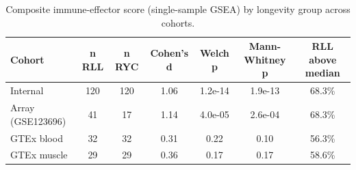 \documentclass[unnumsec,webpdf,contemporary,large]{oup-authoring-template}
\begin{document}
\begin{table}[htbp]
\caption{Composite immune-effector score (single-sample GSEA) by longevity group across cohorts.}
\label{tab:immaxis}
\begin{center}
\begin{tabular}{lcccccc}
\hline
Cohort & n RLL & n RYC & Cohen's d & Welch p & Mann-Whitney p & RLL above median \\
\hline
Internal & 120 & 120 & 1.06 & 1.2e-14 & 1.9e-13 & 68.3\% \\
Array (GSE123696) & 41 & 17 & 1.14 & 4.0e-05 & 2.6e-04 & 68.3\% \\
GTEx blood & 32 & 32 & 0.31 & 0.22 & 0.10 & 56.3\% \\
GTEx muscle & 29 & 29 & 0.36 & 0.17 & 0.17 & 58.6\% \\
\hline
\end{tabular}
\end{center}
\end{table}



\end{document}
